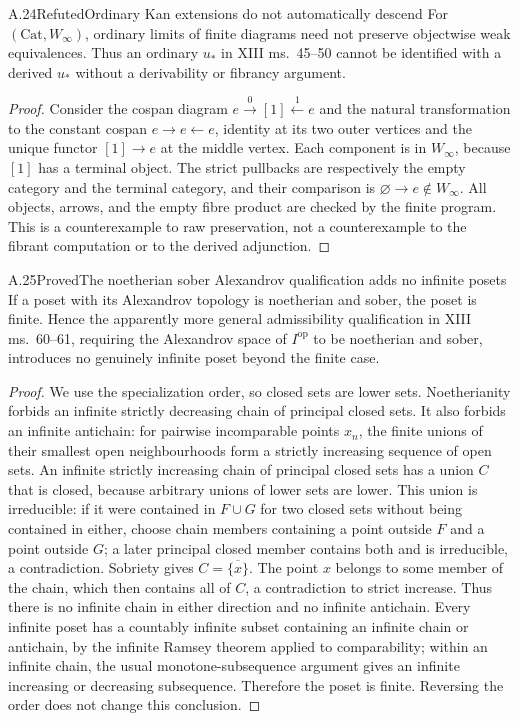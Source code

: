 \begin{claim}{A.24}{Refuted}{Ordinary Kan extensions do not automatically descend}
For $(\mathrm{Cat},W_\infty)$, ordinary limits of finite diagrams need not preserve objectwise weak equivalences. Thus an ordinary $u_*$ in XIII ms.~45--50 cannot be identified with a derived $u_*$ without a derivability or fibrancy argument.
\end{claim}
\begin{proof}
Consider the cospan diagram $e\xrightarrow{0}[1]\xleftarrow{1}e$ and the natural transformation to the constant cospan $e\to e\leftarrow e$, identity at its two outer vertices and the unique functor $[1]\to e$ at the middle vertex. Each component is in $W_\infty$, because $[1]$ has a terminal object. The strict pullbacks are respectively the empty category and the terminal category, and their comparison is $\varnothing\to e\notin W_\infty$. All objects, arrows, and the empty fibre product are checked by the finite program. This is a counterexample to raw preservation, not a counterexample to the fibrant computation or to the derived adjunction.
\end{proof}

\begin{claim}{A.25}{Proved}{The noetherian sober Alexandrov qualification adds no infinite posets}
If a poset with its Alexandrov topology is noetherian and sober, the poset is finite. Hence the apparently more general admissibility qualification in XIII ms.~60--61, requiring the Alexandrov space of $I^{\mathrm{op}}$ to be noetherian and sober, introduces no genuinely infinite poset beyond the finite case.
\end{claim}
\begin{proof}
We use the specialization order, so closed sets are lower sets. Noetherianity forbids an infinite strictly decreasing chain of principal closed sets. It also forbids an infinite antichain: for pairwise incomparable points $x_n$, the finite unions of their smallest open neighbourhoods form a strictly increasing sequence of open sets. An infinite strictly increasing chain of principal closed sets has a union $C$ that is closed, because arbitrary unions of lower sets are lower. This union is irreducible: if it were contained in $F\cup G$ for two closed sets without being contained in either, choose chain members containing a point outside $F$ and a point outside $G$; a later principal closed member contains both and is irreducible, a contradiction. Sobriety gives $C=\overline{\{x\}}$. The point $x$ belongs to some member of the chain, which then contains all of $C$, a contradiction to strict increase. Thus there is no infinite chain in either direction and no infinite antichain. Every infinite poset has a countably infinite subset containing an infinite chain or antichain, by the infinite Ramsey theorem applied to comparability; within an infinite chain, the usual monotone-subsequence argument gives an infinite increasing or decreasing subsequence. Therefore the poset is finite. Reversing the order does not change this conclusion.
\end{proof}

